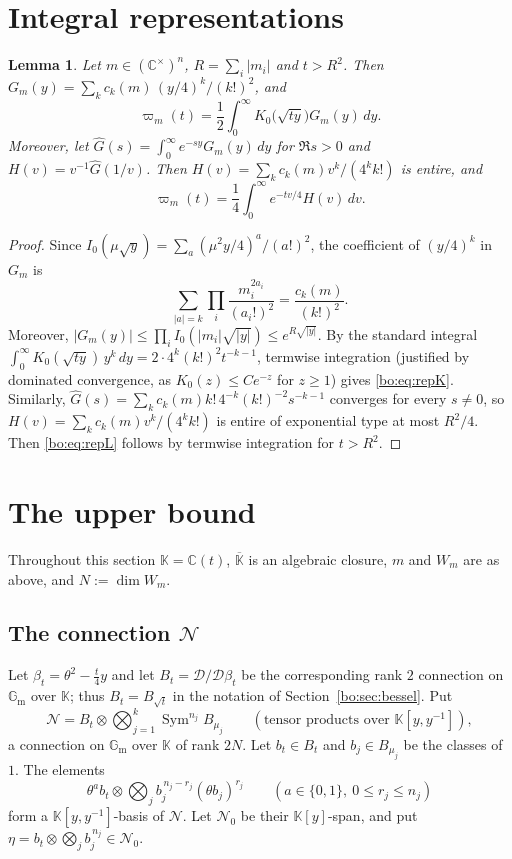 \documentclass[11pt,a4paper]{article}
\newtheorem{lemma}[theorem]{Lemma}
\theoremstyle{definition}
\theoremstyle{remark}
\numberwithin{equation}{section}
\newcommand{\C}{\mathbb{C}}
\newcommand{\Gm}{\mathbb{G}_{\mathrm{m}}}
\newcommand{\Kt}{\mathbb{K}}
\newcommand{\cD}{\mathcal{D}}
\newcommand{\cN}{\mathcal{N}}
\DeclareMathOperator{\Sym}{Sym}
\begin{document}
\section{Integral representations}\label{bo:sec:reps}

\begin{lemma}\label{bo:lem:reps}
Let $m\in(\C^\times)^n$, $R=\sum_i|m_i|$ and $t>R^2$. Then $G_m(y)=\sum_kc_k(m)\,(y/4)^k/(k!)^2$, and
\begin{equation}\label{bo:eq:repK}
\varpi_m(t)=\frac12\int_0^\infty K_0\bigl(\sqrt{ty}\bigr)G_m(y)\,dy .
\end{equation}
Moreover, let $\widehat G(s)=\int_0^\infty e^{-sy}G_m(y)\,dy$ for $\Re s>0$ and $H(v)=v^{-1}\widehat G(1/v)$. Then $H(v)=\sum_kc_k(m)v^k/(4^kk!)$ is entire, and
\begin{equation}\label{bo:eq:repL}
\varpi_m(t)=\frac14\int_0^\infty e^{-tv/4}H(v)\,dv .
\end{equation}
\end{lemma}

\begin{proof}
Since $I_0(\mu\sqrt y)=\sum_a(\mu^2y/4)^a/(a!)^2$, the coefficient of $(y/4)^k$ in $G_m$ is
\[
\sum_{|a|=k}\prod_i\frac{m_i^{2a_i}}{(a_i!)^2}=\frac{c_k(m)}{(k!)^2}.
\]
Moreover, $|G_m(y)|\le\prod_iI_0(|m_i|\sqrt{|y|})\le e^{R\sqrt{|y|}}$. By the standard integral $\int_0^\infty K_0(\sqrt{ty})\,y^k\,dy=2\cdot4^k(k!)^2t^{-k-1}$, termwise integration (justified by dominated convergence, as $K_0(z)\le Ce^{-z}$ for $z\ge1$) gives \eqref{bo:eq:repK}. Similarly, $\widehat G(s)=\sum_kc_k(m)k!\,4^{-k}(k!)^{-2}s^{-k-1}$ converges for every $s\ne0$, so $H(v)=\sum_kc_k(m)v^k/(4^kk!)$ is entire of exponential type at most $R^2/4$. Then \eqref{bo:eq:repL} follows by termwise integration for $t>R^2$.
\end{proof}

\section{The upper bound}\label{bo:sec:upper}

Throughout this section $\Kt=\C(t)$, $\overline{\Kt}$ is an algebraic closure, $m$ and $W_m$ are as above, and $N:=\dim W_m$.

\subsection{The connection \texorpdfstring{$\cN$}{N}}
Let $\beta_t=\theta^2-\tfrac t4y$ and let $B_t=\cD/\cD\beta_t$ be the corresponding rank $2$ connection on $\Gm$ over $\Kt$; thus $B_t=B_{\sqrt t}$ in the notation of Section~\ref{bo:sec:bessel}. Put
\[
\cN=B_t\otimes\bigotimes_{j=1}^k\Sym^{n_j}B_{\mu_j}\qquad(\text{tensor products over }\Kt[y,y^{-1}]),
\]
a connection on $\Gm$ over $\Kt$ of rank $2N$. Let $b_t\in B_t$ and $b_j\in B_{\mu_j}$ be the classes of $1$. The elements
\begin{equation}\label{bo:eq:basis}
\theta^ab_t\otimes\bigotimes_jb_j^{\,n_j-r_j}(\theta b_j)^{r_j}\qquad(a\in\{0,1\},\ 0\le r_j\le n_j)
\end{equation}
form a $\Kt[y,y^{-1}]$-basis of $\cN$. Let $\cN_0$ be their $\Kt[y]$-span, and put $\eta=b_t\otimes\bigotimes_jb_j^{\,n_j}\in\cN_0$.
\end{document}

